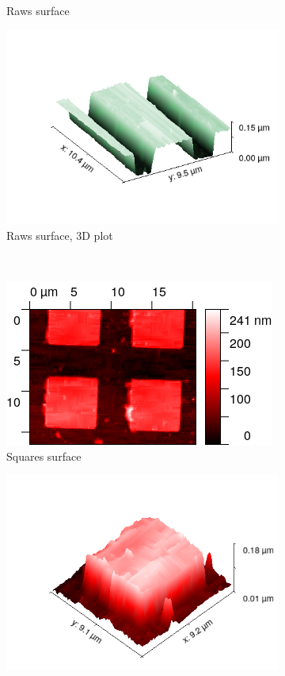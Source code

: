 \documentclass[11pt,a4paper]{article}
\begin{document}
\begin{figure}[H]
\begin{subfigure}[b]{0.45\textwidth}
\caption{Raws surface}
\label{fig:}
\end{subfigure}
\begin{subfigure}[b]{0.45\textwidth}
\includegraphics[width=\textwidth]{tm_raws_3D}
\caption{Raws surface, 3D plot}
\label{fig:}
\end{subfigure}\\\vspace{.2cm}
\begin{subfigure}[b]{0.45\textwidth}
\includegraphics[width=\textwidth]{tm_squares}
\caption{Squares surface}
\label{fig:}
\end{subfigure}
\begin{subfigure}[b]{0.45\textwidth}
\includegraphics[width=\textwidth]{tm_squares_3D}

\end{subfigure}
\end{figure}
\end{document}
